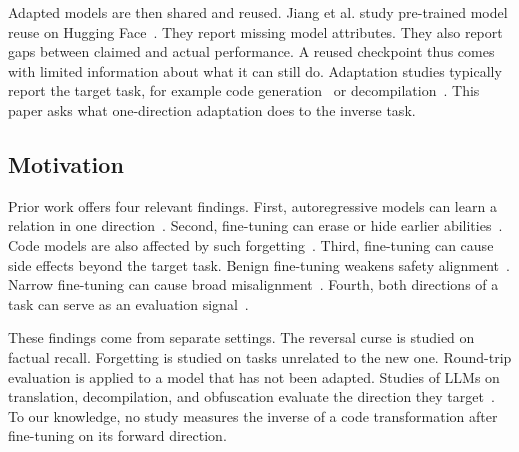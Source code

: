 Adapted models are then shared and reused.
Jiang et al. study pre-trained model reuse on Hugging Face~\cite{jiang2023reuse}.
They report missing model attributes.
They also report gaps between claimed and actual performance.
A reused checkpoint thus comes with limited information about what it can still do.
Adaptation studies typically report the target task, for example code generation~\cite{weyssow2025peft} or decompilation~\cite{tan2024llm4decompile}.
This paper asks what one-direction adaptation does to the inverse task.
 
\subsection{Motivation}
\label{sec:bg-motivation}
 

Prior work offers four relevant findings.
First, autoregressive models can learn a relation in one direction~\cite{berglund2024reversal, lv2024reversal, wang2025binding}.
Second, fine-tuning can erase or hide earlier abilities~\cite{mccloskey1989catastrophic, kirkpatrick2017overcoming, kotha2024implicit}.
Code models are also affected by such forgetting~\cite{weyssow2023continual}.
Third, fine-tuning can cause side effects beyond the target task.
Benign fine-tuning weakens safety alignment~\cite{qi2024finetuning}.
Narrow fine-tuning can cause broad misalignment~\cite{betley2025emergent}.
Fourth, both directions of a task can serve as an evaluation signal~\cite{allamanis2024roundtrip, gu2024cruxeval}.

 
These findings come from separate settings.
The reversal curse is studied on factual recall.
Forgetting is studied on tasks unrelated to the new one.
Round-trip evaluation is applied to a model that has not been adapted.
Studies of LLMs on translation, decompilation, and obfuscation evaluate the direction they target~\cite{pan2024lost,tan2024llm4decompile,mohseni2025obfuscate}.
To our knowledge, no study measures the inverse of a code transformation after fine-tuning on its forward direction.
 
